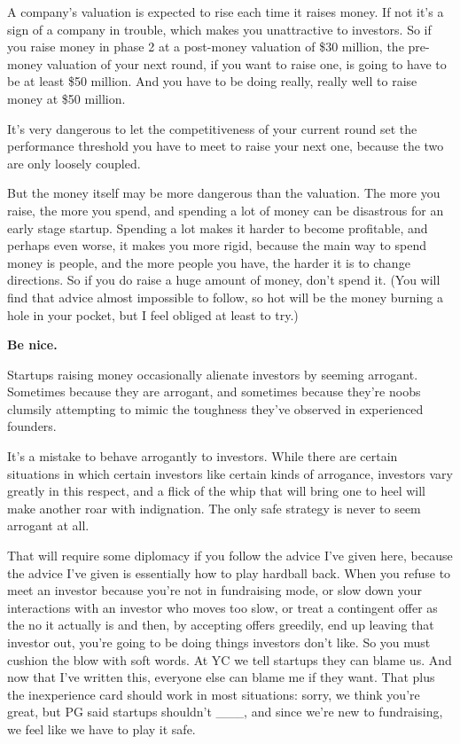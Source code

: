 A company's valuation is expected to rise each time it raises money. If
not it's a sign of a company in trouble, which makes you unattractive to
investors. So if you raise money in phase 2 at a post-money valuation of
\$30 million, the pre-money valuation of your next round, if you want to
raise one, is going to have to be at least \$50 million. And you have to
be doing really, really well to raise money at \$50 million.

It's very dangerous to let the competitiveness of your current round set
the performance threshold you have to meet to raise your next one,
because the two are only loosely coupled.

But the money itself may be more dangerous than the valuation. The more
you raise, the more you spend, and spending a lot of money can be
disastrous for an early stage startup. Spending a lot makes it harder to
become profitable, and perhaps even worse, it makes you more rigid,
because the main way to spend money is people, and the more people you
have, the harder it is to change directions. So if you do raise a huge
amount of money, don't spend it. (You will find that advice almost
impossible to follow, so hot will be the money burning a hole in your
pocket, but I feel obliged at least to try.)

\textbf{Be nice.}

Startups raising money occasionally alienate investors by seeming
arrogant. Sometimes because they are arrogant, and sometimes because
they're noobs clumsily attempting to mimic the toughness they've
observed in experienced founders.

It's a mistake to behave arrogantly to investors. While there are
certain situations in which certain investors like certain kinds of
arrogance, investors vary greatly in this respect, and a flick of the
whip that will bring one to heel will make another roar with
indignation. The only safe strategy is never to seem arrogant at all.

That will require some diplomacy if you follow the advice I've given
here, because the advice I've given is essentially how to play hardball
back. When you refuse to meet an investor because you're not in
fundraising mode, or slow down your interactions with an investor who
moves too slow, or treat a contingent offer as the no it actually is and
then, by accepting offers greedily, end up leaving that investor out,
you're going to be doing things investors don't like. So you must
cushion the blow with soft words. At YC we tell startups they can blame
us. And now that I've written this, everyone else can blame me if they
want. That plus the inexperience card should work in most situations:
sorry, we think you're great, but PG said startups shouldn't \_\_\_, and
since we're new to fundraising, we feel like we have to play it safe.

